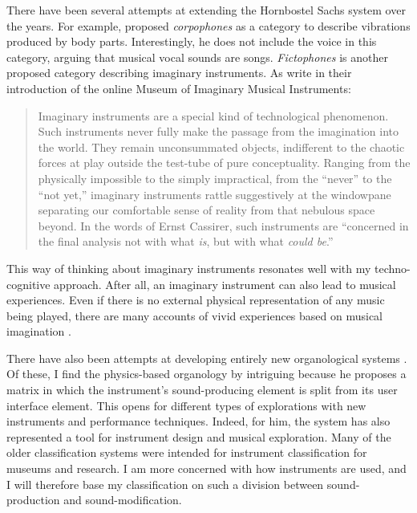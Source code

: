 There have been several attempts at extending the Hornbostel Sachs system over the years. For example, \citet{olsen_is_1986} proposed \emph{corpophones} as a category to describe vibrations produced by body parts. Interestingly, he does not include the voice in this category, arguing that musical vocal sounds are songs.
\emph{Fictophones} is another proposed category describing imaginary instruments. As \citet{loughridge_museum_2013} write in their introduction of the online Museum of Imaginary Musical Instruments:

\begin{quote}
Imaginary instruments are a special kind of technological phenomenon. Such instruments never fully make the passage from the imagination into the world. They remain unconsummated objects, indifferent to the chaotic forces at play outside the test-tube of pure conceptuality. Ranging from the physically impossible to the simply impractical, from the ``never'' to the ``not yet,'' imaginary instruments rattle suggestively at the windowpane separating our comfortable sense of reality from that nebulous space beyond. In the words of Ernst Cassirer, such instruments are ``concerned in the final analysis not with what \emph{is}, but with what \emph{could be}.''
\end{quote}

This way of thinking about imaginary instruments resonates well with my techno-cognitive approach. After all, an imaginary instrument can also lead to musical experiences. Even if there is no external physical representation of any music being played, there are many accounts of vivid experiences based on musical imagination \citep{grimshaw-aagaard_oxford_2019}.

There have also been attempts at developing entirely new organological systems  \citep[see overviews in][]{kvifte_instruments_1989,magnusson_musical_2017}. Of these, I find the physics-based organology by \citet{mann_natural_2007} intriguing because he proposes a matrix in which the instrument's sound-producing element is split from its user interface element. This opens for different types of explorations with new instruments and performance techniques. Indeed, for him, the system has also represented a tool for instrument design and musical exploration. Many of the older classification systems were intended for instrument classification for museums and research. I am more concerned with how instruments are used, and I will therefore base my classification on such a division between sound-production and sound-modification.

